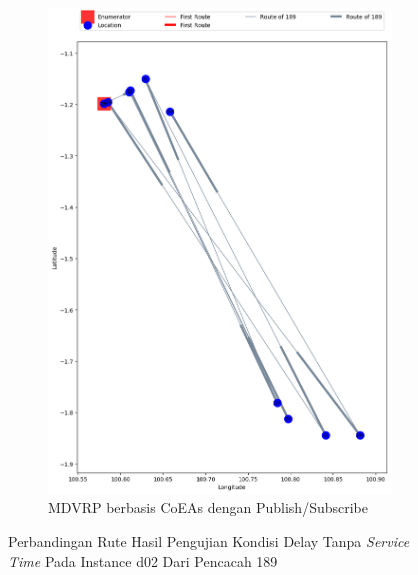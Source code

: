 \begin{figure}[H]\ContinuedFloat
	\centering
	\begin{subfigure}[t]{\textwidth}
		\centering
		\includegraphics[width=\textwidth]{Resources/Images/delayed_2/real_m15_n100_delayed_2_189_pubsub_coes}
		\caption{MDVRP berbasis CoEAs dengan Publish/Subscribe}
		\label{fig:real_m15_n100_delayed_2_189_pubsub_coes}
	\end{subfigure}
	\caption{Perbandingan Rute Hasil Pengujian Kondisi Delay Tanpa \textit{Service Time} Pada Instance d02 Dari Pencacah 189}
	\label{fig:real_m15_n100_delayed_2_189_contd}
\end{figure}


